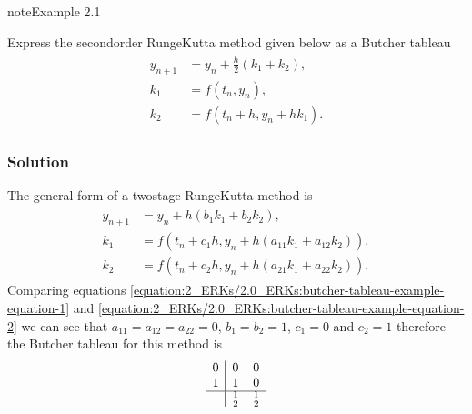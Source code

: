 \documentclass[letterpaper,10pt,english]{jupyterBook}
\begin{document}
\begin{sphinxadmonition}{note}{Example 2.1}

\sphinxAtStartPar
Express the second\sphinxhyphen{}order Runge\sphinxhyphen{}Kutta method given below as a Butcher tableau
\begin{equation}\label{equation:2_ERKs/2.0_ERKs:butcher-tableau-example-equation-1}
\begin{split}\begin{align*}
    y_{n+1} &= y_n + \frac{h}{2}(k_1 + k_2), \\
    k_1 &= f(t_n, y_n), \\
    k_2 &= f\left( t_n + h, y_n + hk_1 \right).
\end{align*}\end{split}
\end{equation}\subsubsection*{Solution}

\sphinxAtStartPar
The general form of a two\sphinxhyphen{}stage Runge\sphinxhyphen{}Kutta method is
\begin{equation}\label{equation:2_ERKs/2.0_ERKs:butcher-tableau-example-equation-2}
\begin{split}\begin{align*}
    y_{n+1} &= y_n + h(b_1 k_1 + b_2 k_2), \\
    k_1 &= f(t_n + c_1 h, y_n + h(a_{11}k_1 + a_{12}k_2)), \\
    k_2 &= f(t_n + c_2 h, y_n + h(a_{21}k_1 + a_{22}k_2)). 
\end{align*}\end{split}
\end{equation}
\sphinxAtStartPar
Comparing equations \eqref{equation:2_ERKs/2.0_ERKs:butcher-tableau-example-equation-1} and \eqref{equation:2_ERKs/2.0_ERKs:butcher-tableau-example-equation-2} we can see that \(a_{11} = a_{12} = a_{22} = 0\), \(b_1 = b_2 = 1\), \(c_1 = 0\) and \(c_2 = 1\) therefore the Butcher tableau for this method is
\begin{align*}
    \begin{array}{c|cc}
        0 & 0 & 0 \\
        1 & 1 & 0 \\ \hline
        & \frac{1}{2} & \frac{1}{2}
    \end{array}
\end{align*}\end{sphinxadmonition}
\end{document}
